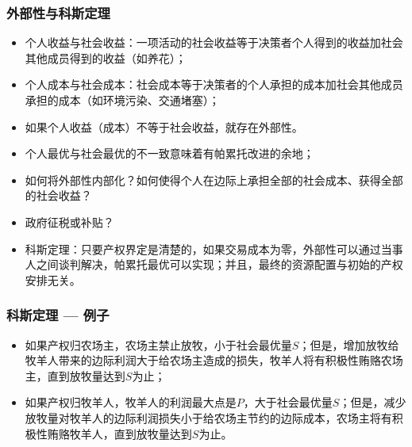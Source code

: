 \documentclass[UTF8,11pt,colorlinks,compress,openany]{beamer}%
\begin{document}
\begin{frame}\frametitle{外部性与科斯定理}
\begin{itemize}
	\item 个人收益与社会收益：一项活动的社会收益等于决策者个人得到的收益加社会其他成员得到的收益（如养花）；
	\item 个人成本与社会成本：社会成本等于决策者的个人承担的成本加社会其他成员承担的成本（如环境污染、交通堵塞）；
	\item 如果个人收益（成本）不等于社会收益，就存在外部性。
	\item 个人最优与社会最优的不一致意味着有帕累托改进的余地；
	\item 如何将外部性内部化？如何使得个人在边际上承担全部的社会成本、获得全部的社会收益？
	\item 政府征税或补贴？
	\item 科斯定理：只要产权界定是清楚的，如果交易成本为零，外部性可以通过当事人之间谈判解决，帕累托最优可以实现；并且，最终的资源配置与初始的产权安排无关。
\end{itemize}
\end{frame}

\begin{frame}\frametitle{科斯定理 --- 例子}
\begin{center}
\end{center}
\begin{itemize}
	\item 如果产权归农场主，农场主禁止放牧，小于社会最优量$S$；但是，增加放牧给牧羊人带来的边际利润大于给农场主造成的损失，牧羊人将有积极性贿赂农场主，直到放牧量达到$S$为止；
	\item 如果产权归牧羊人，牧羊人的利润最大点是$P$，大于社会最优量$S$；但是，减少放牧量对牧羊人的边际利润损失小于给农场主节约的边际成本，农场主将有积极性贿赂牧羊人，直到放牧量达到$S$为止。
\end{itemize}
\end{frame}
\end{document}
